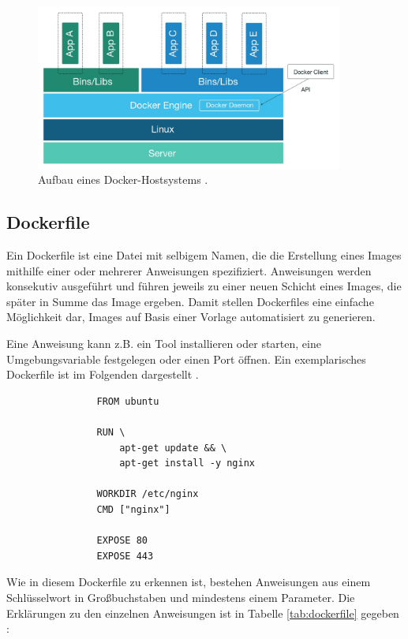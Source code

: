 \documentclass[../main.tex]{subfiles}
\begin{document}
      \begin{figure}[h]
          \centering
          \includegraphics[width=0.9\textwidth]{./images/intro_dockerHost.jpg}
          \caption{Aufbau eines Docker-Hostsystems \cite[S.3]{dockerSecIntro}.}
          \label{fig:intro_dockerHost}
      \end{figure}

		\subsection{Dockerfile}
		\label{dockerDockerfile}
      Ein Dockerfile ist eine Datei mit selbigem Namen, die die Erstellung eines Images mithilfe einer oder mehrerer Anweisungen spezifiziert. Anweisungen werden konsekutiv ausgeführt und führen jeweils zu einer neuen Schicht eines Images, die später in Summe das Image ergeben. Damit stellen Dockerfiles eine einfache Möglichkeit dar, Images auf Basis einer Vorlage automatisiert zu generieren.

			Eine Anweisung kann z.B. ein Tool installieren oder starten, eine Umgebungsvariable festgelegen oder einen Port öffnen. Ein exemplarisches Dockerfile ist im Folgenden dargestellt \cite{githubDockerfileNginx}.

			\begin{lstlisting}
				FROM ubuntu

				RUN \
					apt-get update && \
					apt-get install -y nginx

				WORKDIR /etc/nginx
				CMD ["nginx"]

				EXPOSE 80
				EXPOSE 443
			\end{lstlisting}

			Wie in diesem Dockerfile zu erkennen ist, bestehen Anweisungen aus einem Schlüsselwort in Großbuchstaben und mindestens einem Parameter. Die Erklärungen zu den einzelnen Anweisungen ist in Tabelle \ref{tab:dockerfile} gegeben \cite{dockerDockerfileDocs}:
\end{document}
